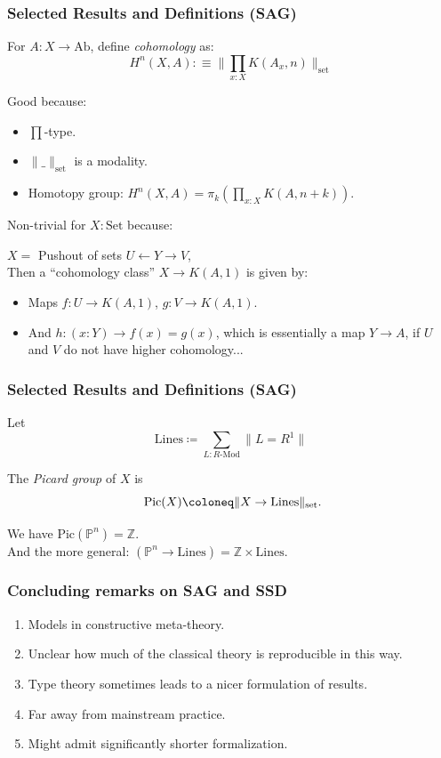 \documentclass{beamer}
\begin{document}
\begin{frame}
  \frametitle{Selected Results and Definitions (SAG)}
  \vspace{0.25cm}
  For $A : X \to \mathrm{Ab}$, define \emph{cohomology} as:
  \[ H^n(X, A) :\equiv \Big\| \prod_{x:X}K(A_x,n) \Big\|_{\mathrm{set}} \]
  
  \pause
  Good because:
  \begin{itemize}
  \item $\prod$-type.
  \item $\|\_\|_{\mathrm{set}}$ is a modality.
  \item Homotopy group: $H^n(X,A)=\pi_{k}(\prod_{x:X}K(A,n+k))$.
  \end{itemize}

  \pause
  Non-trivial for $X:\mathrm{Set}$ because:

  $X=$ Pushout of sets $U\leftarrow Y\to V$, \\
  Then a ``cohomology class'' $X\to K(A,1)$ is given by:
  \begin{itemize}
  \item Maps $f:U\to K(A,1)$, $g:V\to K(A,1)$.
  \item And $h:(x:Y)\to f(x)=g(x)$, which is essentially a map $Y\to A$,
    if $U$ and $V$ do not have higher cohomology...
  \end{itemize}
\end{frame}

\begin{frame}
  \frametitle{Selected Results and Definitions (SAG)}

  Let
  \[ \mathrm{Lines} \coloneq \sum_{L : R\text{-Mod}} \lVert L = R^1 \rVert \]

  \pause
  \vspace{5mm}
  The \emph{Picard group} of $X$ is
  \[ \mathrm{Pic}(X) \coloneq \lVert X \to \mathrm{Lines} \rVert_{\text{set}} \rlap{.}\]
  
  \pause
  We have $\mathrm{Pic}(\mathbb P^n)=\mathbb Z$. \\
  \pause
  And the more general: $(\mathbb P^n \to \mathrm{Lines}) = \mathbb Z \times \mathrm{Lines}$. \\
\end{frame}

\begin{frame}
  \frametitle{Concluding remarks on SAG and SSD}
  \begin{enumerate}[(1)]
  \item Models in constructive meta-theory.
  \item Unclear how much of the classical theory is reproducible in this way.
  \item Type theory sometimes leads to a nicer formulation of results.
  \item Far away from mainstream practice.
  \item Might admit significantly shorter formalization. 
  \end{enumerate}
\end{frame}
\end{document}
